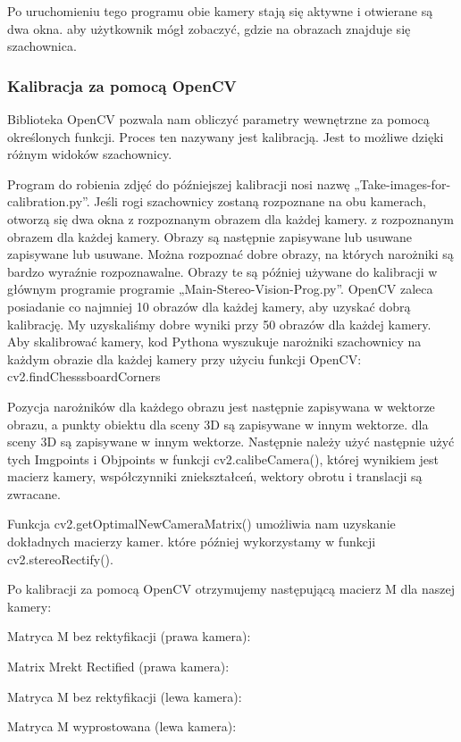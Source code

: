 \documentclass[magisterska]{pracadypl}
\begin{document}
Po uruchomieniu tego programu obie kamery stają się aktywne i otwierane są dwa okna.
aby użytkownik mógł zobaczyć, gdzie na obrazach znajduje się szachownica.


\subsubsection{Kalibracja za pomocą OpenCV}

Biblioteka OpenCV pozwala nam obliczyć parametry wewnętrzne za pomocą określonych funkcji.
Proces ten nazywany jest kalibracją. Jest to możliwe dzięki różnym
widoków szachownicy.

Program do robienia zdjęć do późniejszej kalibracji nosi nazwę
„Take-images-for-calibration.py”.
Jeśli rogi szachownicy zostaną rozpoznane na obu kamerach, otworzą się dwa okna z rozpoznanym obrazem dla każdej kamery.
z rozpoznanym obrazem dla każdej kamery. Obrazy są następnie zapisywane lub usuwane
zapisywane lub usuwane. Można rozpoznać dobre obrazy, na których narożniki
są bardzo wyraźnie rozpoznawalne. Obrazy te są później używane do kalibracji w głównym programie
programie „Main-Stereo-Vision-Prog.py”. OpenCV zaleca posiadanie co najmniej 10
obrazów dla każdej kamery, aby uzyskać dobrą kalibrację. My uzyskaliśmy dobre wyniki przy 50
obrazów dla każdej kamery.
Aby skalibrować kamery, kod Pythona wyszukuje narożniki szachownicy na każdym
obrazie dla każdej kamery przy użyciu funkcji OpenCV: cv2.findChesssboardCorners

Pozycja narożników dla każdego obrazu jest następnie zapisywana w wektorze obrazu, a punkty obiektu dla sceny 3D są zapisywane w innym wektorze.
dla sceny 3D są zapisywane w innym wektorze. Następnie należy użyć
następnie użyć tych Imgpoints i Objpoints w funkcji cv2.calibeCamera(), której wynikiem jest
macierz kamery, współczynniki zniekształceń, wektory obrotu i translacji
są zwracane.

Funkcja cv2.getOptimalNewCameraMatrix() umożliwia nam uzyskanie dokładnych macierzy kamer.
które później wykorzystamy w funkcji cv2.stereoRectify().

Po kalibracji za pomocą OpenCV otrzymujemy następującą macierz M dla naszej kamery:

Matryca M bez rektyfikacji (prawa kamera):

Matrix Mrekt Rectified (prawa kamera):

Matryca M bez rektyfikacji (lewa kamera):

Matryca M wyprostowana (lewa kamera):
\end{document}
